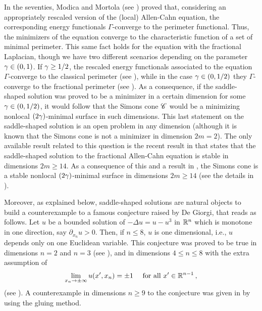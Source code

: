 In the seventies, Modica and Mortola (see \cite{Modica,ModicaMortola}) proved that, considering an appropriately rescaled version of the (local) Allen-Cahn equation, the corresponding energy functionals $\Gamma$-converge to the perimeter functional. Thus, the minimizers of the equation converge to the characteristic function of a set of minimal perimeter. This same fact holds for the equation with the fractional Laplacian, though we have two different scenarios depending on the parameter $\gamma \in (0,1)$. If $\gamma \geq 1/2$, the rescaled energy functionals associated to the equation $\Gamma$-converge to the classical perimeter (see \cite{GiovanniBouchitteSeppecher,Gonzalez}), while in the case $\gamma \in (0,1/2)$ they $\Gamma$-converge to the fractional perimeter (see \cite{SavinValdinoci-GammaConvergence}). As a consequence, if the saddle-shaped solution was proved to be a minimizer in a certain dimension for some $\gamma \in (0,1/2)$, it would follow that the Simons cone $\mathscr{C}$ would be a minimizing nonlocal $(2\gamma)$-minimal surface in such dimensions. This last statement on the saddle-shaped solution is an open problem in any dimension (although it is known that the Simons cone is not a minimizer in dimension $2m=2$). The only available result related to this question is the recent result in \cite{Felipe-Sanz-Perela:SaddleFractional} that states that the saddle-shaped solution to the fractional Allen-Cahn equation is stable in dimensions $2m\geq 14$. As a consequence of this and a result in \cite{CabreCintiSerra-Stable}, the Simons cone is a stable nonlocal $(2\gamma)$-minimal surface in dimensions $ 2m\geq 14$ (see the details in \cite{Felipe-Sanz-Perela:SaddleFractional}).


Moreover, as explained below, saddle-shaped solutions are natural objects to build a counterexample to a famous conjecture raised by De Giorgi, that reads as follows. Let $u$ be a bounded solution of $-\Delta  u = u - u^3$ in $\mathbb{R}^n$ which is monotone in one direction, say $\partial_{x_n} u > 0$. Then, if $n\leq 8$, $u$ is one dimensional, i.e., $u$ depends only on one Euclidean variable. This conjecture was proved to be true in dimensions $n=2$ and  $n=3$ (see \cite{GhoussoubGui,AmbrosioCabre}), and in dimensions $4\leq n \leq 8$ with the extra assumption of
\begin{equation}
\label{Eq:SavinCondition}
\lim_{x_n \to \pm \infty} u(x',x_n) = \pm 1 \quad \text{ for all } x'\in \mathbb{R}^{n-1}\,,
\end{equation}
(see \cite{Savin-DeGiorgi}). A counterexample in dimensions $n\geq 9$ to the conjecture was given in \cite{delPinoKowalczykWei} by using the gluing method. 


